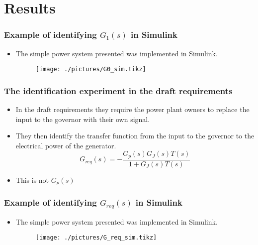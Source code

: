 \section{Results}
\begin{frame}
		\frametitle{Example of identifying $G_1(s)$ in Simulink }
	\begin{itemize}
			\item The simple power system presented was implemented in Simulink.
			\begin{figure}
					\texttt{[image: ./pictures/G0\_sim.tikz]}
			\end{figure}
	\end{itemize}
\end{frame}
\begin{frame}
	\frametitle{The identification experiment in the draft requirements}
	\begin{itemize}[<+->]
			\item In the draft requirements they require the power plant owners to replace the input to the governor with their own signal.
			\item They then identify the transfer function from the input to the governor to the electrical power of the generator.
			\begin{equation}\label{eq:G_req}
				G_{req}(s) = -\frac{G_p(s)G_J(s)T(s)}{1+G_J(s)T(s)}
			\end{equation}
			\item This is not $G_p(s)$
	\end{itemize}
\end{frame}
\begin{frame}
		\frametitle{Example of identifying $G_{req}(s)$ in Simulink }
	\begin{itemize}
			\item The simple power system presented was implemented in Simulink.
			\begin{figure}
					\texttt{[image: ./pictures/G\_req\_sim.tikz]}
			\end{figure}
	\end{itemize}
\end{frame}
